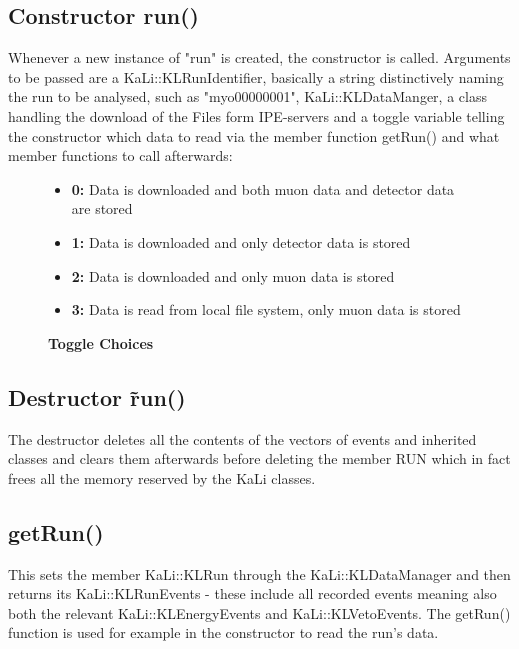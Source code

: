     \subsection{Constructor run()}
    \label{ch:Analysis software:sec:methods of the class run:subsec:Constructor}
    Whenever a new instance of "run" is created, the constructor is called. Arguments to be passed are a KaLi::KLRunIdentifier, basically a string distinctively naming the run to be analysed, such as "myo00000001", KaLi::KLDataManger, a class handling the download of the Files form IPE-servers and a toggle variable telling the constructor which data to read via the member function getRun() and what member functions to call afterwards:
    \begin{figure}
    \caption*{\bf Toggle Choices}
    	\begin{itemize}
    		\item {\bf 0:} Data is downloaded and both muon data and detector data are stored
    		\item {\bf 1:} Data is downloaded and only detector data is stored
    		\item {\bf 2:} Data is downloaded and only muon data is stored
    		\item {\bf 3:} Data is read from local file system, only muon data is stored
    	\end{itemize}
    \end{figure}
    
    \subsection{Destructor \~ run()}
    \label{ch:Analysis software:sec:methods of the class run:subsec:Constructor}
    The destructor deletes all the contents of the vectors of events and inherited classes and clears them afterwards before deleting the member RUN which in fact frees all the memory reserved by the KaLi classes.
    
    \subsection{getRun()}
    \label{ch:Analysis software:sec:methods of the class run:subsec:getRun()}
    
    This sets the member KaLi::KLRun through the KaLi::KLDataManager and then returns its KaLi::KLRunEvents - these include all recorded events meaning also both the relevant KaLi::KLEnergyEvents and KaLi::KLVetoEvents. The getRun() function is used for example in the constructor to read the run's data.
    
